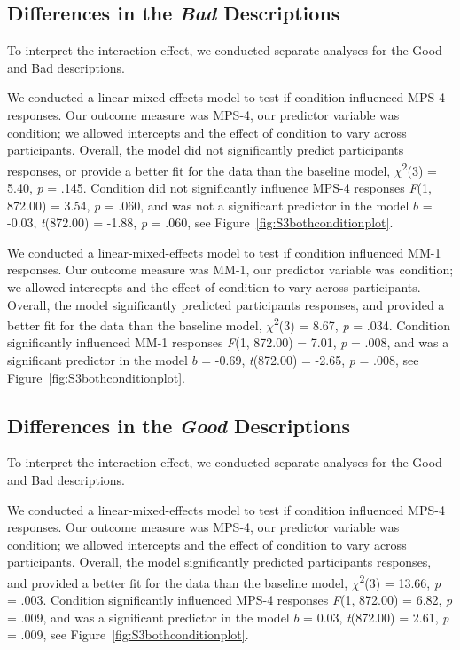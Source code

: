 \documentclass[
  american,
  man,floatsintext]{apa7}
\begin{document}
\hypertarget{differences-in-the-bad-descriptions}{%
\subsection{\texorpdfstring{Differences in the \emph{Bad} Descriptions}{Differences in the Bad Descriptions}}\label{differences-in-the-bad-descriptions}}

To interpret the interaction effect, we conducted separate analyses for the Good and Bad descriptions.

We conducted a linear-mixed-effects model to test if condition influenced MPS-4 responses. Our outcome measure was MPS-4, our predictor variable was condition; we allowed intercepts and the effect of condition to vary across participants. Overall, the model did not significantly predict participants responses, or provide a better fit for the data than the baseline model, \(\chi\)\textsuperscript{2}(3) = 5.40, \emph{p} = .145. Condition did not significantly influence MPS-4 responses \emph{F}(1, 872.00) = 3.54, \emph{p} = .060, and was not a significant predictor in the model \(b\) = -0.03, \emph{t}(872.00) = -1.88, \emph{p} = .060, see Figure~\ref{fig:S3bothconditionplot}.

We conducted a linear-mixed-effects model to test if condition influenced MM-1 responses. Our outcome measure was MM-1, our predictor variable was condition; we allowed intercepts and the effect of condition to vary across participants. Overall, the model significantly predicted participants responses, and provided a better fit for the data than the baseline model, \(\chi\)\textsuperscript{2}(3) = 8.67, \emph{p} = .034. Condition significantly influenced MM-1 responses \emph{F}(1, 872.00) = 7.01, \emph{p} = .008, and was a significant predictor in the model \(b\) = -0.69, \emph{t}(872.00) = -2.65, \emph{p} = .008, see Figure~\ref{fig:S3bothconditionplot}.

\hypertarget{differences-in-the-good-descriptions}{%
\subsection{\texorpdfstring{Differences in the \emph{Good} Descriptions}{Differences in the Good Descriptions}}\label{differences-in-the-good-descriptions}}

To interpret the interaction effect, we conducted separate analyses for the Good and Bad descriptions.

We conducted a linear-mixed-effects model to test if condition influenced MPS-4 responses. Our outcome measure was MPS-4, our predictor variable was condition; we allowed intercepts and the effect of condition to vary across participants. Overall, the model significantly predicted participants responses, and provided a better fit for the data than the baseline model, \(\chi\)\textsuperscript{2}(3) = 13.66, \emph{p} = .003. Condition significantly influenced MPS-4 responses \emph{F}(1, 872.00) = 6.82, \emph{p} = .009, and was a significant predictor in the model \(b\) = 0.03, \emph{t}(872.00) = 2.61, \emph{p} = .009, see Figure~\ref{fig:S3bothconditionplot}.
\end{document}
